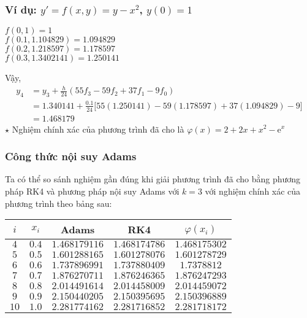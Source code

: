 \begin{frame}\small
	\frametitle{Ví dụ: $y'=f(x,y)=y-x^2$, $y(0)=1$}
	\begin{center}
	$f(0,1)          =1$\\
	$f(0.1,1.104829) =1.094829$\\
	$f(0.2,1.218597) =1.178597$\\
	$f(0.3,1.3402141)=1.250141$
	\end{center}
	Vậy,
	\begin{align*}
		y_4&=y_3+\frac{h}{24}(55f_3-59f_2+37f_1-9f_0)\\
		   &=1.340141+\frac{0.1}{24}\big[55(1.250141)-59(1.178597)+37(1.094829)-9\big]\\
		   &=1.468179
	\end{align*}
	$\star$ Nghiệm chính xác của phương trình đã cho là $\varphi(x)=2+2x+x^2-\mathrm{e}^{x}$\par
\end{frame}

\begin{frame}
	\frametitle{Công thức nội suy Adams}
	Ta có thể so sánh nghiệm gần đúng khi giải phương trình đã cho bằng phương pháp RK4 và phương pháp nội suy Adams với $k=3$ với nghiệm chính xác của phương trình theo bảng sau:\par

	\begin{table}\begin{tabular}{|c|c|c|c|c|}\hline
		$i$  & $x_i$ & Adams         & RK4           & $\varphi(x_i)$ \\ \hline
		$4$  & $0.4$ & $1.468179116$ & $1.468174786$ & $1.468175302$  \\ \hline
		$5$  & $0.5$ & $1.601288165$ & $1.601278076$ & $1.601278729$  \\ \hline
		$6$  & $0.6$ & $1.737896991$ & $1.737880409$ & $1.7378812$    \\ \hline
		$7$  & $0.7$ & $1.876270711$ & $1.876246365$ & $1.876247293$  \\ \hline
		$8$  & $0.8$ & $2.014491614$ & $2.014458009$ & $2.014459072$  \\ \hline
		$9$  & $0.9$ & $2.150440205$ & $2.150395695$ & $2.150396889$  \\ \hline
		$10$ & $1.0$ & $2.281774162$ & $2.281716852$ & $2.281718172$  \\ \hline
	\end{tabular}\end{table}
\end{frame}
